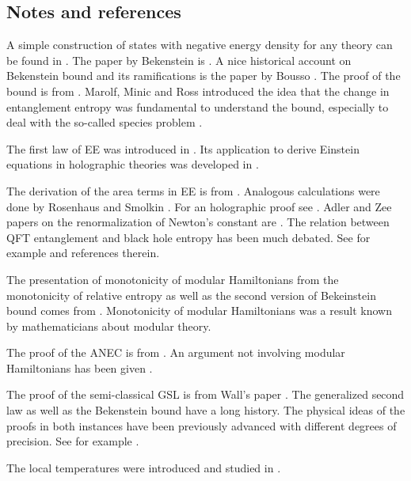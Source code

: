 \documentclass[11pt]{article}
\numberwithin{equation}{section}
\begin{document}
\subsection{Notes and references}
A simple construction of states with negative energy density for any theory can be found in \cite{Witten:2018lha}.  The paper by Bekenstein is \cite{bekenstein1981universal}. A nice historical account on Bekenstein bound and its ramifications is the paper by Bousso \cite{Bousso:2018bli}.
 The proof of the bound is from \cite{Casini:2008cr}. Marolf, Minic and Ross introduced the idea that the change in entanglement entropy was fundamental to understand the bound, especially to deal with the so-called species problem \cite{Marolf:2003sq}. 
 
The first law of EE was introduced in \cite{Blanco:2013joa,Wong:2013gua}. Its application to derive Einstein equations in holographic theories was developed in \cite{Lashkari:2013koa,Faulkner:2013ica}.   

The derivation of the area terms in EE is from \cite{Casini:2014yca}. Analogous calculations were done by Rosenhaus and Smolkin  \cite{Rosenhaus:2014ula}. For an holographic proof see \cite{Casini:2015ffa}. Adler and Zee papers on the renormalization of Newton's constant are \cite{Adler:1982ri,Zee:1980sj}. The relation between QFT entanglement and black hole entropy has been much debated. See for example \cite{Cooperman:2013iqr} and references therein. 

The presentation of monotonicity of modular Hamiltonians from the monotonicity of relative entropy as well as the second version of Bekeinstein bound comes from \cite{Blanco:2013lea}. Monotonicity of modular Hamiltonians was a result known by mathematicians about modular theory.     

The proof of the ANEC is from \cite{Faulkner:2016mzt}. An argument not involving modular Hamiltonians has been given \cite{Hartman:2016lgu}.  
 
The proof of the semi-classical GSL is from Wall's paper \cite{Wall:2011hj}. The generalized second law as well as the Bekenstein bound have a long history. The physical ideas of the proofs in both instances have been previously advanced with different degrees of precision. See for example \cite{Marolf:2003wu,Marolf:2003sq,sorkin1986toward,Sorkin:1997ja,Frolov:1993fy,zurek1985statistical}.

The local temperatures were introduced and studied in \cite{Arias:2016nip,Arias:2017dda}. 
\end{document}
